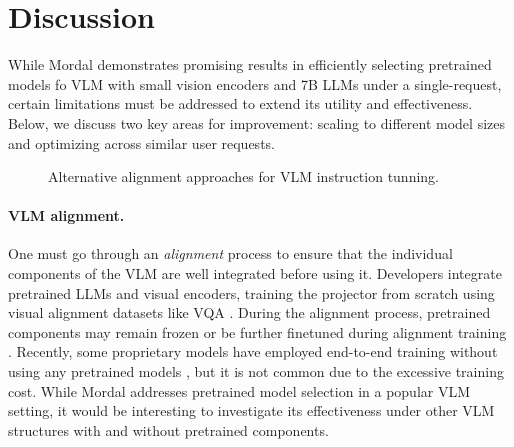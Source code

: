 \section{Discussion}
While Mordal demonstrates promising results in efficiently selecting pretrained models fo VLM with small vision encoders and 7B LLMs under a single-request, certain limitations must be addressed to extend its utility and effectiveness. Below, we discuss two key areas for improvement: scaling to different model sizes and optimizing across similar user requests.

\begin{figure}[h]
    \centering
    \caption{Alternative alignment approaches for VLM instruction tunning.}
    \label{fig:instruction_tuning}
\end{figure}

\paragraph{VLM alignment.} 
One must go through an \emph{alignment} process to ensure that the individual components of the VLM are well integrated before using it. 
Developers integrate pretrained LLMs and visual encoders, training the projector from scratch using visual alignment datasets like VQA \cite{antol2015vqa} . 
During the alignment process, pretrained components may remain frozen 
or be further finetuned during alignment training \cite{liu2023improved}. 
Recently, some proprietary models have employed end-to-end training without using any pretrained models \cite{bai2023qwen}, but it is not common due to the excessive training cost. While Mordal addresses pretrained model selection in a popular VLM setting, it would be interesting to investigate its effectiveness under other VLM structures with and without pretrained components.

